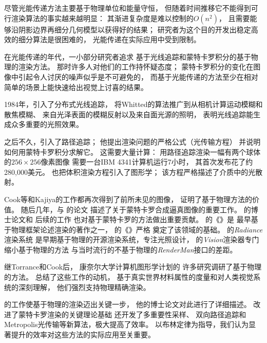 尽管光能传递方法主要基于物理单位和能量守恒，
但随着时间推移它不能得到可行渲染算法的事实越来越明显：
其渐进复杂度是难以控制的$O(n^2)$，
且需要能够沿阴影边界再细分几何模型以获得好的结果；
研究者为这个目的开发出稳定高效的细分算法是很困难的，
光能传递在实际应用中受到限制。

在光能传递的年代，一小部分研究者追求
基于光线追踪和蒙特卡罗积分的基于物理的渲染方法。
那时许多人对他们的工作持怀疑态度；
蒙特卡罗积分的变化在图像中引起令人讨厌的噪声似乎是不可避免的，
而基于光能传递的方法至少在相对简单的场景上能快速给出视觉上讨喜的结果。

1984年，\citet{10.1145/800031.808590}引入了分布式光线追踪，
将Whitted的算法推广到从相机计算运动模糊和散焦模糊、
来自光泽表面的模糊反射以及来自面光源的照明，
表明光线追踪能生成众多重要的光照效果。

之后不久，\citet{10.1145/15922.15902}引入了路径追踪；
他提出渲染问题的严格公式（光传输方程）
并说明如何用蒙特卡罗积分求解它。
这需要大量计算：
用路径追踪渲染一幅有两个球体的$256\times256$像素图像
需要一台IBM 4341计算机运行7小时，
其首次发布花了约280,000美元\citep{farmer1981comparing}。
\citet{10.1145/800031.808594}
也把体积渲染方程引入了图形学；
该方程严格描述了介质中的光散射。

Cook等和Kajiya的工作都再次得到了前所未见的图像，
证明了基于物理方法的价值。
随后几年，\citet{10.1145/97879.97886}与
\citet{10.1145/122718.122735}的论文
描述了关于蒙特卡罗合成逼真图像的重要工作。
\citet{10.5555/124947}的博士论文和
后续\citet{10.1145/226150.226151}的工作
也对基于蒙特卡罗的方法做出重要贡献。
\citet{10.1007/978-1-4612-3526-2}的《》是
最早基于物理框架论述渲染的著作之一，
\citet{GLASSNER1995}的《》严格
奠定了该领域的基础。
\citet{10.1145/192161.192286}的\emph{Radiance}渲染系统
是早期基于物理的开源渲染系统，专注光照设计，
\citet{slusallek1996vision}的\emph{Vision}渲染器专门缩小基于物理的方法
与当时流行的不基于物理的\emph{RenderMan}接口的差距。

继Torrance和Cook后，
康奈尔大学计算机图形学计划的
许多研究调研了基于物理的方法。
\citet{10.1145/258734.258914}总结了这些工作的动机，
基于真实世界材料属性的度量和对人类视觉系统的深刻理解，
他们强烈支持物理精确渲染。

\citet{veach1997robust}的工作使基于物理的渲染迈出关键一步，
他的博士论文对此进行了详细描述。
\citeauthor{veach1997robust}改进了蒙特卡罗渲染的关键理论基础
还开发了多重要性采样、
双向路径追踪和Metropolis光传输等新算法，极大提高了效率。
以布林定律为指导，我们认为显著提升的效率对这些方法的实际应用至关重要。

